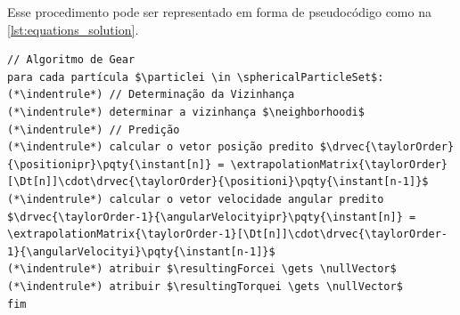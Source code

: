 Esse procedimento pode ser representado em forma de pseudocódigo como na \cref{lst:equations_solution}.

\begin{lstlisting}[float, floatplacement=h, language=pseudocode, label=lst:equations_solution, caption=Pseudocódigo para a solução das equações de movimento de partículas esféricas por meio do algoritmo de Gear.]
// Algoritmo de Gear
para cada partícula $\particlei \in \sphericalParticleSet$:
(*\indentrule*)	// Determinação da Vizinhança
(*\indentrule*)	determinar a vizinhança $\neighborhoodi$
(*\indentrule*)	// Predição
(*\indentrule*)	calcular o vetor posição predito $\drvec{\taylorOrder}{\positionipr}\pqty{\instant[n]} = \extrapolationMatrix{\taylorOrder}[\Dt[n]]\cdot\drvec{\taylorOrder}{\positioni}\pqty{\instant[n-1]}$
(*\indentrule*)	calcular o vetor velocidade angular predito $\drvec{\taylorOrder-1}{\angularVelocityipr}\pqty{\instant[n]} = \extrapolationMatrix{\taylorOrder-1}[\Dt[n]]\cdot\drvec{\taylorOrder-1}{\angularVelocityi}\pqty{\instant[n-1]}$
(*\indentrule*)	atribuir $\resultingForcei \gets \nullVector$
(*\indentrule*)	atribuir $\resultingTorquei \gets \nullVector$
fim


\end{lstlisting}
